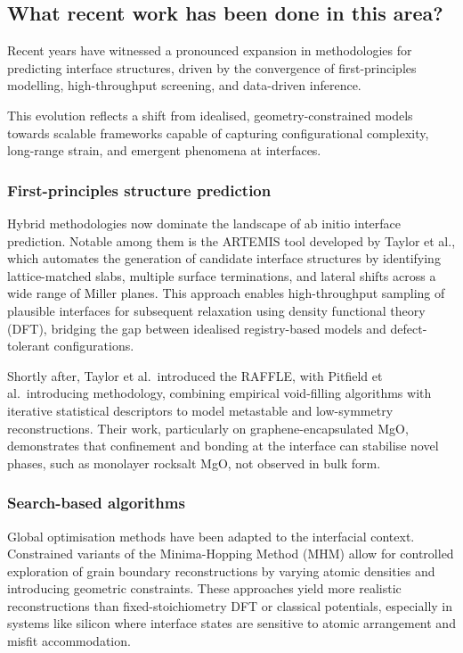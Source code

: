 \subsection{What recent work has been done in this area?} 
 
Recent years have witnessed a pronounced expansion in methodologies for predicting interface structures, driven by the convergence of first-principles modelling, high-throughput screening, and data-driven inference. 
 
This evolution reflects a shift from idealised, geometry-constrained models towards scalable frameworks capable of capturing configurational complexity, long-range strain, and emergent phenomena at interfaces. 
 
\subsubsection{First-principles structure prediction} 
 
Hybrid methodologies now dominate the landscape of ab initio interface prediction. Notable among them is the \textsc{ARTEMIS} tool developed by Taylor et al., which automates the generation of candidate interface structures by identifying lattice-matched slabs, multiple surface terminations, and lateral shifts across a wide range of Miller planes. This approach enables high-throughput sampling of plausible interfaces for subsequent relaxation using density functional theory (DFT), bridging the gap between idealised registry-based models and defect-tolerant configurations. 
 
Shortly after, Taylor et al.\ introduced the \textsc{RAFFLE}, with Pitfield et al.\ introducing methodology, combining empirical void-filling algorithms with iterative statistical descriptors to model metastable and low-symmetry reconstructions. Their work, particularly on graphene-encapsulated MgO, demonstrates that confinement and bonding at the interface can stabilise novel phases, such as monolayer rocksalt MgO, not observed in bulk form. 
 
\subsubsection{Search-based algorithms} 
 
Global optimisation methods have been adapted to the interfacial context. Constrained variants of the Minima-Hopping Method (MHM) allow for controlled exploration of grain boundary reconstructions by varying atomic densities and introducing geometric constraints. These approaches yield more realistic reconstructions than fixed-stoichiometry DFT or classical potentials, especially in systems like silicon where interface states are sensitive to atomic arrangement and misfit accommodation. 
 
